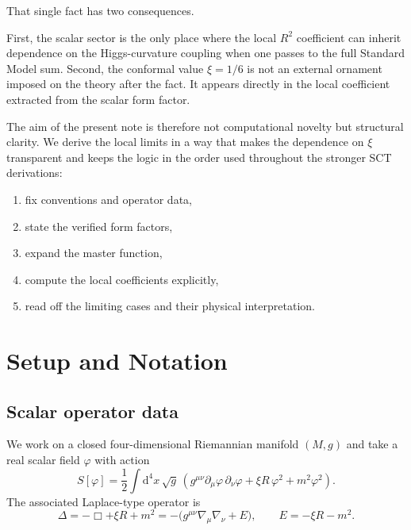 \documentclass[11pt,a4paper]{article}
\newcommand{\dd}{\mathrm{d}}
\newcommand{\Boxop}{\Box}
\theoremstyle{definition}
\theoremstyle{remark}
\begin{document}
That single fact has two consequences.

First, the scalar sector is the only place where the local $R^2$ coefficient
can inherit dependence on the Higgs-curvature coupling when one passes to the
full Standard Model sum.  Second, the conformal value $\xi = 1/6$ is not an
external ornament imposed on the theory after the fact.  It appears directly
in the local coefficient extracted from the scalar form factor.

The aim of the present note is therefore not computational novelty but
structural clarity.  We derive the local limits in a way that makes the
dependence on $\xi$ transparent and keeps the logic in the order used
throughout the stronger SCT derivations:
\begin{enumerate}[label=\arabic*.]
  \item fix conventions and operator data,
  \item state the verified form factors,
  \item expand the master function,
  \item compute the local coefficients explicitly,
  \item read off the limiting cases and their physical interpretation.
\end{enumerate}

\section{Setup and Notation}
\label{sec:setup}

\subsection{Scalar operator data}

We work on a closed four-dimensional Riemannian manifold $(M,g)$ and take a
real scalar field $\varphi$ with action
\begin{equation}
  S[\varphi]
  = \frac{1}{2}\int \dd^4x\,\sqrt{g}\,
  \left(
    g^{\mu\nu}\partial_\mu\varphi\,\partial_\nu\varphi
    + \xi R\,\varphi^2 + m^2\varphi^2
  \right).
  \label{eq:scalar-action}
\end{equation}
The associated Laplace-type operator is
\begin{equation}
  \Delta = -\Boxop + \xi R + m^2
  = -\bigl(g^{\mu\nu}\nabla_\mu\nabla_\nu + E\bigr),
  \qquad
  E = -\xi R - m^2.
  \label{eq:laplace-operator}
\end{equation}
\end{document}
